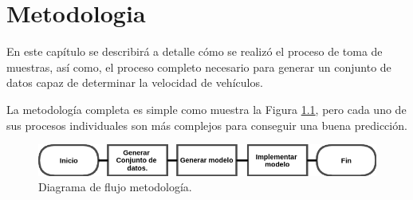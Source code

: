 \chapter{Metodologia}

En este capítulo se describirá a detalle cómo se realizó el proceso de toma de muestras, así como, el proceso completo necesario para generar un conjunto de datos capaz de determinar la velocidad de vehículos.

La metodología completa es simple como muestra la Figura \ref{fig:MetodologiaDF}, pero cada uno de sus procesos individuales son más complejos para conseguir una buena predicción.

\begin{figure}[H]
    \centering
    \includegraphics[width=1\textwidth]{Metodologia/imgs/MetodologiaDF.png}
    \caption{Diagrama de flujo metodología.}
    \label{fig:MetodologiaDF}
\end{figure}




